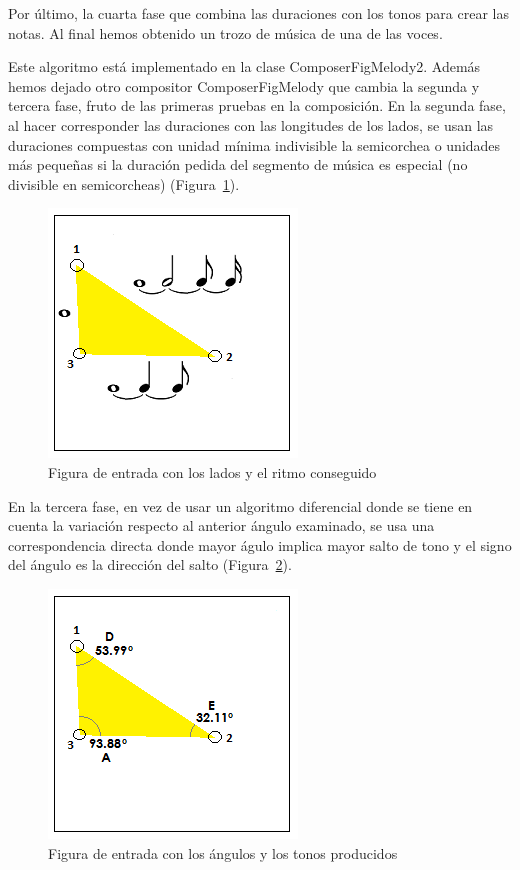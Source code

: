Por último, la cuarta fase que combina las duraciones con los tonos para crear las notas. Al final hemos obtenido un trozo de música de una de las voces.

Este algoritmo está implementado en la clase ComposerFigMelody2. Además hemos dejado otro compositor ComposerFigMelody que cambia la segunda y tercera fase, fruto de las primeras pruebas en la composición. En la segunda fase, al hacer corresponder las duraciones con las longitudes de los lados, se usan las duraciones compuestas con unidad mínima indivisible la semicorchea o unidades más pequeñas si la duración pedida del segmento de música es especial (no divisible en semicorcheas) (Figura~\ref{fig:Figura5Voz1}).

		\begin{figure}[htbp]
		\centering
		\hspace*{0.0in}
		\includegraphics[scale=1]{graphics/simpletest1-F2_2.png}
		\caption{Figura de entrada con los lados y el ritmo conseguido}
		\label{fig:Figura5Voz1}
		\end{figure}

En la tercera fase, en vez de usar un algoritmo diferencial donde se tiene en cuenta la variación respecto al anterior ángulo examinado, se usa una correspondencia directa donde mayor águlo implica mayor salto de tono y el signo del ángulo es la dirección del salto (Figura~\ref{fig:Figura6Voz1}).

		\begin{figure}[htbp]
		\centering
		\hspace*{0.0in}
		\includegraphics[scale=1]{graphics/simpletest1-F3_2.png}
		\caption{Figura de entrada con los ángulos y los tonos producidos}
		\label{fig:Figura6Voz1}
		\end{figure}

